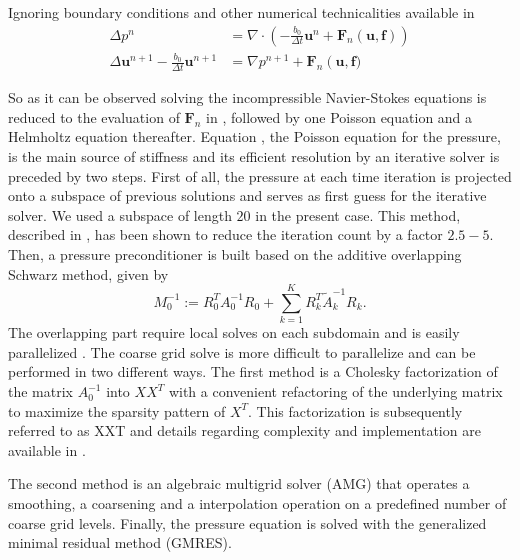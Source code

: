 \documentclass{sig-alternate}
\begin{document}
Ignoring boundary conditions and other numerical technicalities available in \cite{Tomboulides1997} 
\begin{align}
 \Delta p^{n} & = \nabla \cdot \left( -\frac{b_0}{\Delta t} \mathbf{u}^{n} + \mathbf{F}_n \left( \mathbf{u},\mathbf f \right) \right) \label{eqn:hmhz_pres}\\
 \Delta \mathbf{u}^{n+1}- \frac{b_0}{\Delta t} \mathbf{u}^{n+1}  & =  \nabla p^{n+1} + \mathbf{F}_n \left( \mathbf{u}, \mathbf f) \right. \label{eqn:hmhz_vel}
\end{align}

So as it can be observed solving the incompressible Navier-Stokes equations is reduced to the evaluation of $\mathbf{F}_n$ in , followed by one Poisson equation and a Helmholtz equation thereafter. 
Equation , the Poisson equation for the pressure, is the main source of stiffness and its efficient resolution by an iterative solver is preceded by two steps. First of all, the pressure at each time iteration is projected onto a subspace of previous solutions and serves as first guess for the iterative solver. We used a subspace of length $20$ in the present case. This method, described in \cite{Fischer1998}, has been shown to reduce the iteration count by a factor $2.5-5$. Then, a pressure preconditioner is built based on the additive overlapping Schwarz method, given by 
\begin{equation}
 M_0^{-1} := R_0^T A_{0}^{-1} R_0 + \sum_{k=1}^{K} R_k^T \tilde{A}_k^{-1} R_k.
\end{equation}
The overlapping part require local solves on each subdomain and is easily parallelized \cite{Fischer199784,Fischer2005}. The coarse grid solve is more difficult to parallelize and can be performed in two different ways. The first method is a Cholesky factorization of the matrix $A_0^{-1}$ into $XX^T$ with a convenient refactoring of the underlying matrix to maximize the sparsity pattern of $X^T$. This factorization is subsequently referred to as XXT and details regarding complexity and implementation are available in \cite{Tufo2001151}. 

The second method is an algebraic multigrid solver (AMG) that operates a smoothing, a coarsening and a interpolation operation on a predefined number of coarse grid levels. Finally, the pressure equation is solved with the generalized minimal residual method (GMRES).
\end{document}
